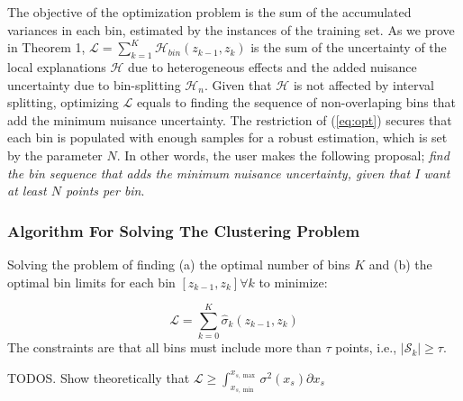 \documentclass[twoside]{article}
\begin{document}
The objective of the optimization problem is the sum of the
accumulated variances in each bin, estimated by the instances of the
training set. As we prove in Theorem 1,
\(\mathcal{L} = \sum_{k=1}^K \mathcal{H}_{bin}(z_{k-1}, z_k)\) is the
sum of the uncertainty of the local explanations \(\mathcal{H}\) due
to heterogeneous effects and the added nuisance uncertainty due to
bin-splitting \(\mathcal{H}_n\). Given that \(\mathcal{H}\) is not
affected by interval splitting, optimizing \(\mathcal{L}\) equals to
finding the sequence of non-overlaping bins that add the minimum
nuisance uncertainty. The restriction of (\ref{eq:opt}) secures that
each bin is populated with enough samples for a robust estimation,
which is set by the parameter \(N\). In other words, the user makes
the following proposal; \textit{find the bin sequence that adds the
  minimum nuisance uncertainty, given that I want at least \(N\)
  points per bin}.

\subsubsection{Algorithm For Solving The Clustering Problem}
\label{sec:dynamic-programing}

Solving the problem of finding (a) the optimal number of bins \(K\)
and (b) the optimal bin limits for each bin
\([z_{k-1}, z_k] \forall k\) to minimize:

\begin{equation}
  \label{eq:1}
  \mathcal{L} = \sum_{k=0}^K \hat{\sigma}_k(z_{k-1}, z_k)
\end{equation}
%
The constraints are that all bins must include more than \(\tau\)
points, i.e., \(|\mathcal{S}_k| \geq \tau\).

\noindent
TODOS. Show theoretically that \(\mathcal{L} \geq \int_{x_{s, \min}}^{x_{s, \max}}\sigma^2(x_s) \partial x_s\)


\end{document}
